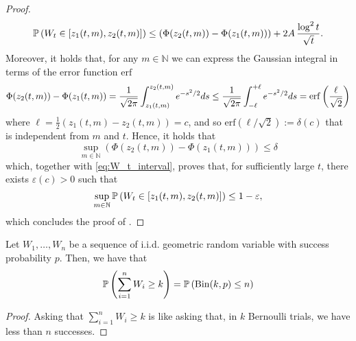 \documentclass{article}
\newcommand{\Prob}[1]{\bbP\left(#1\right)}
\begin{document}
\begin{proof}
\begin{equation}
        \operatorname{\mathbb{P}} \left(  W_t \in \left[ z_1(t,m) , z_2(t,m) \right]  \right) \leq \left( \Phi(z_2(t,m)) - \Phi(z_1(t,m)) \right) +2 A \, \frac{\log^2 t}{\sqrt{t}}.
        \label{eq:W_t_interval}
    \end{equation}
    Moreover, it holds that, for any $m \in \mathbb{N}$ we can express the Gaussian integral in terms of the error function $\mathrm{erf}$
    \[\Phi(z_2(t,m)) - \Phi(z_1(t,m)) = \frac{1}{\sqrt{2\pi}}\int_{z_1(t,m)}^{z_2(t,m)} e^{-s^2/2}ds \leq \frac{1}{\sqrt{2 \pi}}\int_{-\ell}^{+\ell} e^{-s^2/2}ds = \mathrm{erf}\left( \frac{\ell}{\sqrt{2}} \right)\]
    where $\ell = \frac{1}{2}(z_1(t,m)-z_2(t,m)) = c$, and so $\mathrm{erf}(\ell/\sqrt{2}) := \delta(c)$ that is independent from $m$ and $t$. Hence, it holds that
    \[\sup_{m\in \mathbb{N}}(\Phi(z_2(t,m)) - \Phi(z_1(t,m)))  \leq \delta\]
    which, together with \cref{eq:W_t_interval}, proves that, for sufficiently large $t$, there exists $\varepsilon(c)>0$  such that
    \[\sup_{m \in \mathbb{N}}\Prob{W_t \in [z_1(t,m),z_2(t,m)]} \leq 1-\varepsilon,\]
    which concludes the proof of .
\end{proof}

\begin{lemma}    \label{lem:sum_geometric}
    Let $W_1,\dots,W_n$ be a sequence of i.i.d. geometric random variable with success probability $p$. Then, we have that
    \[\Prob{\sum_{i=1}^{n}W_i \geq k} = \Prob{\mathrm{Bin}(k,p) \leq n}\]
\end{lemma}

\begin{proof}
    Asking that $\sum_{i=1}^n W_i \geq k$ is like asking that, in $k$ Bernoulli trials, we have less than $n$ successes.
\end{proof}
\end{document}

